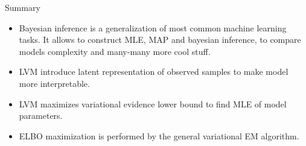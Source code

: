 \begin{frame}{Summary}
	\begin{itemize}
		\item Bayesian inference is a generalization of most common machine learning tasks. It allows to construct MLE, MAP and bayesian inference, to compare models complexity and many-many more cool stuff.
		\vfill
		\item LVM introduce latent representation of observed samples to make model more interpretable.
		\vfill
		\item LVM maximizes variational evidence lower bound to find MLE of model parameters.
		\vfill
		\item ELBO maximization is performed by the general variational EM algorithm.
	\end{itemize}
\end{frame}
 
